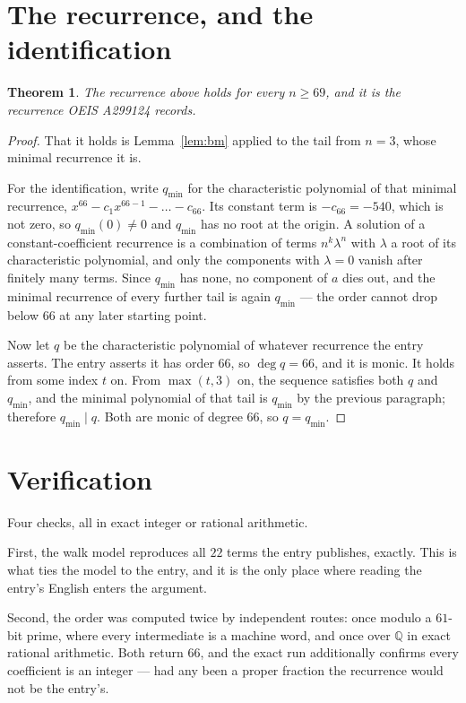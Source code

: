 \documentclass[11pt,a4paper]{article}
\theoremstyle{plain}
\newtheorem{theorem}{Theorem}
\theoremstyle{definition}
\begin{document}
\section{The recurrence, and the identification}

\begin{theorem}
The recurrence above holds for every $n\ge69$, and it is the recurrence OEIS A299124 records.
\end{theorem}

\begin{proof}
That it holds is Lemma~\ref{lem:bm} applied to the tail from $n=3$, whose minimal
recurrence it is.

For the identification, write $q_{\min}$ for the characteristic polynomial of that minimal
recurrence, $x^{66}-c_1x^{66-1}-\dots-c_{66}$. Its constant term is
$-c_{66}=-540$, which is not zero, so $q_{\min}(0)\neq0$ and $q_{\min}$ has no
root at the origin. A solution of a constant-coefficient recurrence is a combination of terms
$n^{k}\lambda^{n}$ with $\lambda$ a root of its characteristic polynomial, and only the
components with $\lambda=0$ vanish after finitely many terms. Since $q_{\min}$ has none, no
component of $a$ dies out, and the minimal recurrence of every further tail is again
$q_{\min}$ --- the order cannot drop below $66$ at any later starting point.

Now let $q$ be the characteristic polynomial of whatever recurrence the entry asserts. The
entry asserts it has order $66$, so $\deg q=66$, and it is monic. It holds from some
index $t$ on. From $\max(t,3)$ on, the sequence satisfies both $q$ and $q_{\min}$, and
the minimal polynomial of that tail is $q_{\min}$ by the previous paragraph; therefore
$q_{\min}\mid q$. Both are monic of degree $66$, so $q=q_{\min}$.
\end{proof}

\section{Verification}

Four checks, all in exact integer or rational arithmetic.

First, the walk model reproduces all $22$ terms the entry publishes, exactly. This is
what ties the model to the entry, and it is the only place where reading the entry's English
enters the argument.

Second, the order was computed twice by independent routes: once modulo a $61$-bit prime, where
every intermediate is a machine word, and once over $\mathbb{Q}$ in exact rational arithmetic.
Both return $66$, and the exact run additionally confirms every coefficient is an integer
--- had any been a proper fraction the recurrence would not be the entry's.
\end{document}
